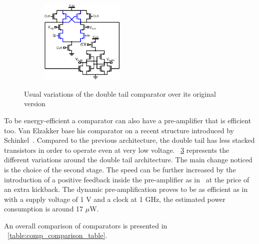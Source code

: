 \begin{figure}[htp]
\begin{subfigure}[b]{0.48\textwidth}
        \label{fig:dbl_tail_chan}
    \end{subfigure}
    \begin{subfigure}[b]{0.48\textwidth}
        \centering
        \includegraphics[height=4cm]{Chapter7/Figs/dbl_tail_babayan.ps}
        \label{fig:dbl_tail_babayan}
    \end{subfigure}
	\caption{Usual variations of the double tail comparator over its original version}
	\label{fig:dbl_tail_comp}
\end{figure}

To be energy-efficient a comparator can also have a pre-amplifier that is efficient too. Van Elzakker base his comparator on a recent structure introduced by Schinkel~\cite{Schinkel2007, Elzakker2010}. Compared to the previous architecture, the double tail has less stacked transistors in order to operate even at very low voltage. \figurename~\ref{fig:dbl_tail_comp} represents the different variations around the double tail architecture. The main change noticed is the choice of the second stage. The speed can be further increased by the introduction of a positive feedback inside the pre-amplifier as in~\cite{Bult1997,Babayan2014} at the price of an extra kickback. The dynamic pre-amplification proves to be as efficient as in~\cite{Savani2015} with a supply voltage of 1 V and a clock at 1 GHz, the estimated power consumption is around 17 \(\mu \)W.

An overall comparison of comparators is presented in \tablename~\ref{table:comp_comparison_table}.

